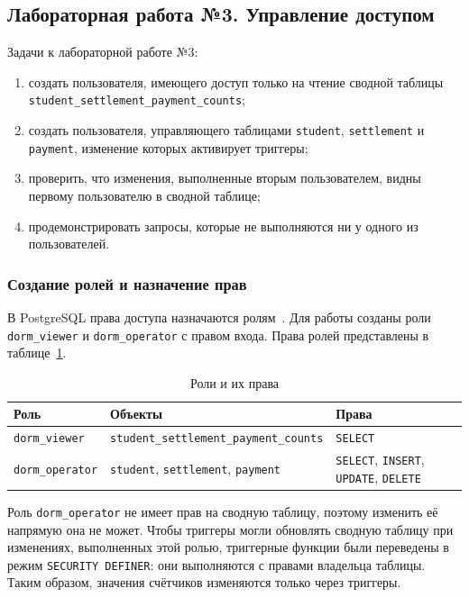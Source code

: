 \newpage
\subsection{Лабораторная работа №3. Управление доступом}

Задачи к лабораторной работе №3:

\begin{enumerate}
\item создать пользователя, имеющего доступ только на чтение сводной таблицы \texttt{student\_settlement\_payment\_counts};
\item создать пользователя, управляющего таблицами \texttt{student}, \texttt{settlement} и \texttt{payment}, изменение которых активирует триггеры;
\item проверить, что изменения, выполненные вторым пользователем, видны первому пользователю в сводной таблице;
\item продемонстрировать запросы, которые не выполняются ни у одного из пользователей.
\end{enumerate}

\subsubsection{Создание ролей и назначение прав}

В PostgreSQL права доступа назначаются ролям~\cite{pg-roles}. Для работы созданы роли \texttt{dorm\_viewer} и \texttt{dorm\_operator} с правом входа. Права ролей представлены в таблице~\ref{tab:roles}.

\begin{table}[H]
\centering
\caption{Роли и их права}
\label{tab:roles}
\begin{tabularx}{\textwidth}{|>{\raggedright\arraybackslash}p{3.5cm}|>{\raggedright\arraybackslash}X|>{\raggedright\arraybackslash}p{3.8cm}|}
\hline
\textbf{Роль} & \textbf{Объекты} & \textbf{Права} \\ \hline
\texttt{dorm\_viewer} & \texttt{student\_settlement\_payment\_counts} & \texttt{SELECT} \\ \hline
\texttt{dorm\_operator} & \texttt{student}, \texttt{settlement}, \texttt{payment} & \texttt{SELECT}, \texttt{INSERT}, \texttt{UPDATE}, \texttt{DELETE} \\ \hline
\end{tabularx}
\end{table}


Роль \texttt{dorm\_operator} не имеет прав на сводную таблицу, поэтому изменить её напрямую она не может. Чтобы триггеры могли обновлять сводную таблицу при изменениях, выполненных этой ролью, триггерные функции были переведены в режим \texttt{SECURITY DEFINER}: они выполняются с правами владельца таблицы. Таким образом, значения счётчиков изменяются только через триггеры.

